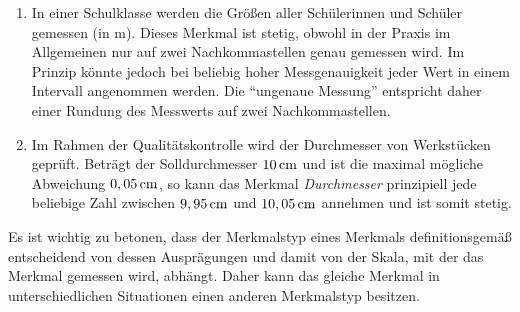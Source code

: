 \documentclass{lecture}
\begin{document}
    \begin{example}
        \begin{enumerate}
            \item In einer Schulklasse werden die Größen aller Schülerinnen und Schüler gemessen (in \si{\meter}).
            Dieses Merkmal ist stetig, obwohl in der Praxis im Allgemeinen nur auf zwei Nachkommastellen genau gemessen wird.
            Im Prinzip könnte jedoch bei beliebig hoher Messgenauigkeit jeder Wert in einem Intervall angenommen werden.
            Die ``ungenaue Messung'' entspricht daher einer Rundung des Messwerts auf zwei Nachkommastellen.
            \item Im Rahmen der Qualitätskontrolle wird der Durchmesser von Werkstücken geprüft.
            Beträgt der Solldurchmesser \(10\,\si{\centi\meter}\) und ist die maximal mögliche Abweichung \(0,05\,\si{\centi\meter}\), so kann das Merkmal \emph{Durchmesser} prinzipiell jede beliebige Zahl zwischen \(9,95\,\si{\centi\meter}\) und \(10,05\,\si{\centi\meter}\) annehmen und ist somit stetig.
        \end{enumerate}
    \end{example}

    Es ist wichtig zu betonen, dass der Merkmalstyp eines Merkmals definitionsgemäß entscheidend von dessen Ausprägungen und damit von der Skala, mit der das Merkmal gemessen wird, abhängt.
    Daher kann das gleiche Merkmal in unterschiedlichen Situationen einen anderen Merkmalstyp besitzen.
\end{document}
